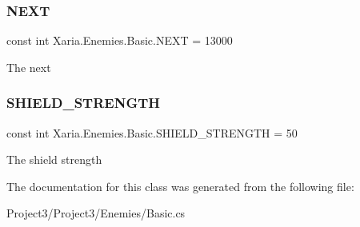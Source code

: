 \subsubsection{\texorpdfstring{N\+E\+XT}{NEXT}}
{\footnotesize\ttfamily const int Xaria.\+Enemies.\+Basic.\+N\+E\+XT = 13000\hspace{0.3cm}{\ttfamily [private]}}



The next 

\mbox{\label{classXaria_1_1Enemies_1_1Basic_a7b7d731586922c39e6c4ed9a7e380dbf}} 
\subsubsection{\texorpdfstring{S\+H\+I\+E\+L\+D\+\_\+\+S\+T\+R\+E\+N\+G\+TH}{SHIELD\_STRENGTH}}
{\footnotesize\ttfamily const int Xaria.\+Enemies.\+Basic.\+S\+H\+I\+E\+L\+D\+\_\+\+S\+T\+R\+E\+N\+G\+TH = 50\hspace{0.3cm}{\ttfamily [private]}}



The shield strength 



The documentation for this class was generated from the following file\+:\begin{DoxyCompactItemize}
\item 
Project3/\+Project3/\+Enemies/Basic.\+cs\end{DoxyCompactItemize}

